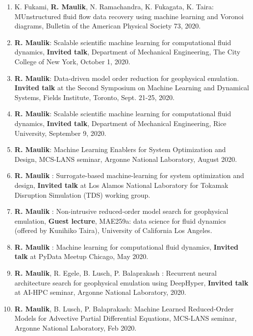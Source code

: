 \documentclass[letterpaper]{article}
\begin{document}
\begin{enumerate}

\item K. Fukami, \textbf{R. Maulik}, N. Ramachandra, K. Fukagata, K. Taira: MUnstructured fluid flow data recovery using machine learning and Voronoi diagrams, Bulletin of the American Physical Society 73, 2020.

\item \textbf{R. Maulik}: Scalable scientific machine learning for computational fluid dynamics, \textbf{Invited talk}, Department of Mechanical Engineering, The City College of New York, October 1, 2020.

\item \textbf{R. Maulik}: Data-driven model order reduction for geophysical emulation. \textbf{Invited talk} at the Second Symposium on Machine Learning and Dynamical Systems, Fields Institute, Toronto, Sept. 21-25, 2020.

\item \textbf{R. Maulik}: Scalable scientific machine learning for computational fluid dynamics, \textbf{Invited talk}, Department of Mechanical Engineering, Rice University, September 9, 2020.

\item \textbf{R. Maulik}: Machine Learning Enablers for System Optimization and Design, MCS-LANS seminar, Argonne National Laboratory, August 2020.

\item \textbf{R. Maulik} : Surrogate-based machine-learning for system optimization and design, \textbf{Invited talk} at Los Alamos National Laboratory for Tokamak Disruption Simulation (TDS) working group.

\item \textbf{R. Maulik} : Non-intrusive reduced-order model search for geophysical emulation, \textbf{Guest lecture}, MAE259a: data science for fluid dynamics (offered by Kunihiko Taira), University of California Los Angeles.

\item \textbf{R. Maulik} : Machine learning for computational fluid dynamics, \textbf{Invited talk} at PyData Meetup Chicago, May 2020.

\item \textbf{R. Maulik}, R. Egele, B. Lusch, P. Balaprakash : Recurrent neural architecture search for geophysical emulation using DeepHyper, \textbf{Invited talk} at AI-HPC seminar, Argonne National Laboratory, 2020.

\item \textbf{R. Maulik}, B. Lusch, P. Balaprakash: Machine Learned Reduced-Order Models for Advective Partial Differential Equations, MCS-LANS seminar, Argonne National Laboratory, Feb 2020.


\end{enumerate}
\end{document}
